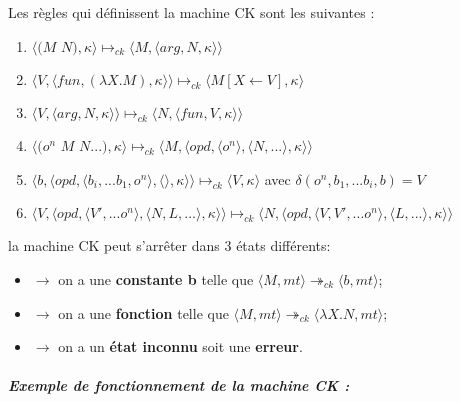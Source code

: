 \documentclass[10pt,a4paper]{article}
\begin{document}
				
				Les règles qui définissent la machine CK sont les suivantes :
				\begin{enumerate}
					\item $\langle(M$ $N),\kappa\rangle \longmapsto_{ck} \langle M,\langle arg,N,\kappa\rangle\rangle$
					\item $\langle V,\langle fun,(\lambda X.M),\kappa \rangle \rangle \longmapsto_{ck} \langle M[X \leftarrow V],\kappa\rangle$
					\item $\langle V,\langle arg,N,\kappa \rangle \rangle \longmapsto_{ck} \langle N,\langle fun,V,\kappa \rangle \rangle$
					\item $\langle(o^{n}$ $M$ $N...),\kappa\rangle \longmapsto_{ck} \langle M,\langle opd,\langle o^{n}\rangle,\langle N,...\rangle,\kappa\rangle\rangle$
					\item $\langle b,\langle opd,\langle b_{i},...b_{1},o^{n}\rangle,\langle\rangle,\kappa\rangle\rangle \longmapsto_{ck} \langle V,\kappa\rangle$ avec $\delta(o^{n},b_{1},...b_{i},b) = V$
					\item $\langle V,\langle opd,\langle V',...o^{n}\rangle,\langle N,L,...\rangle,\kappa\rangle\rangle \longmapsto_{ck} \langle N,\langle opd,\langle V,V',...o^{n}\rangle,\langle L,...\rangle,\kappa\rangle\rangle$
				\end{enumerate}
				\bigbreak
				
				
				la machine CK peut s'arrêter dans 3 états différents:
				\begin{itemize}
					\item[]$\longrightarrow$ on a une \textbf{constante b} telle que $\langle M,mt\rangle \twoheadrightarrow_{ck} \langle b,mt\rangle$;
					\item[]$\longrightarrow$ on a une \textbf{fonction} telle que $\langle M,mt\rangle \twoheadrightarrow_{ck} \langle\lambda X.N,mt\rangle$;
					\item[]$\longrightarrow$ on a un \textbf{état inconnu} soit une \textbf{erreur}.
				\end{itemize}
				\newpage
			
			
			
				\subparagraph{Exemple de fonctionnement de la machine CK :}
				
\end{document}
